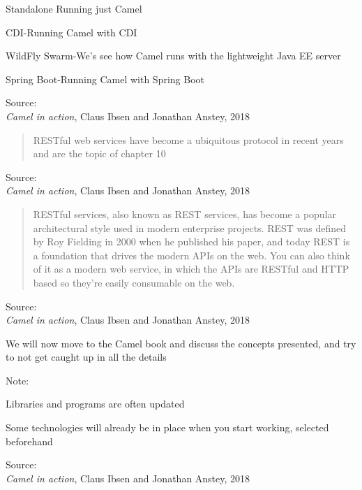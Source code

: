\documentclass[Screen16to9,17pt]{foils}
\begin{document}
\begin{list2}
\item Standalone Running just Camel
\item CDI-Running Camel with CDI
\item WildFly Swarm-We’s see how Camel runs with the lightweight Java EE server
\item Spring Boot-Running Camel with Spring Boot
\end{list2}

Source: {\footnotesize\\
\emph{Camel in action}, Claus Ibsen and Jonathan Anstey, 2018}




\begin{quote}
RESTful web services have become a ubiquitous protocol in recent years and
  are the topic of chapter 10
\end{quote}

Source: {\footnotesize\\
\emph{Camel in action}, Claus Ibsen and Jonathan Anstey, 2018}



\begin{quote}
  RESTful services, also known as REST services, has become a popular architectural style
  used in modern enterprise projects. REST was defined by Roy Fielding in 2000 when
  he published his paper, and today REST is a foundation that drives the modern APIs
  on the web. You can also think of it as a modern web service, in which the APIs are
  RESTful and HTTP based so they’re easily consumable on the web.
\end{quote}

Source: {\footnotesize\\
\emph{Camel in action}, Claus Ibsen and Jonathan Anstey, 2018}



We will now move to the Camel book and discuss the concepts presented, and try to not get caught up in all the details

Note:
\begin{list2}
\item Libraries and programs are often updated
\item Some technologies will already be in place when you start working, selected beforehand

\end{list2}
Source: {\footnotesize\\
\emph{Camel in action}, Claus Ibsen and Jonathan Anstey, 2018}
\end{document}
